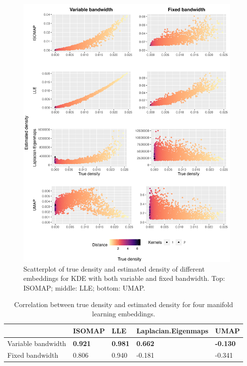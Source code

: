 \documentclass[11pt,a4paper,]{article}
\begin{document}
\begin{figure}

{\centering \includegraphics[width=0.95\linewidth]{figures/fived_density_comparison_4ml_riem20} 

}

\caption{Scatterplot of true density and estimated density of different embeddings for KDE with both variable and fixed bandwidth. Top: ISOMAP; middle: LLE; bottom: UMAP.}\label{fig:fivedisomapden}
\end{figure}

\begin{table}

\caption{\label{tab:fivedcors}Correlation between true density and estimated density for four manifold learning embeddings.}
\centering
\begin{tabular}[t]{l>{}l>{}l>{}l>{}l}
\toprule
  & ISOMAP & LLE & Laplacian.Eigenmaps & UMAP\\
\midrule
Variable bandwidth & \textbf{0.921} & \textbf{0.981} & \textbf{0.662} & \textbf{-0.130}\\
Fixed bandwidth & 0.806 & 0.940 & -0.181 & -0.341\\
\bottomrule
\end{tabular}
\end{table}
\end{document}
